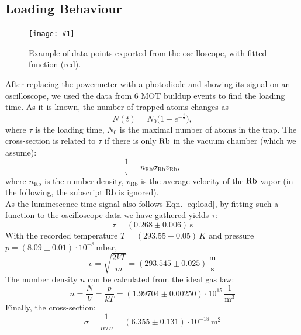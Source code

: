 \documentclass[twocolumn]{article}
\newcommand{\insertFigure}[1]{%
   \texttt{[image: \#1]}%
}
\begin{document}
\subsection{Loading Behaviour}
\begin{figure} [!h]
\centering
\insertFigure{Images/mot_buildup.png}
\caption{Example of data points exported from the oscilloscope, with fitted function (red).}
\label{fig:buildup}
\end{figure}
After replacing the powermeter with a photodiode and showing its signal on an oscilloscope, we used the data from 6 MOT buildup events to find the loading time. As it is known,\cite{inexpensive} the number of trapped atoms changes as
\begin{equation}\label{eq:load}
N(t) = N_0 \big( 1 - e^{-\frac{t}{\tau}} \big),
\end{equation}
where $\tau$ is the loading time, $N_0$ is the maximal number of atoms in the trap. The cross-section is related to $\tau$ if there is only $\ce{Rb}$ in the vacuum chamber (which we assume):
\begin{equation}\label{eq:cross-section}
\frac{1}{\tau} = n_{\text{Rb}} \sigma_{\text{Rb}} v_{\text{Rb}},
\end{equation}
where $n_{\text{Rb}}$ is the number density, $v_{\text{Rb}}$ is the average velocity of the $\ce{Rb}$ vapor (in the following, the subscript Rb is ignored).\\
As the luminescence-time signal also follows Eqn. \ref{eq:load}, by fitting such a function to the oscilloscope data we have gathered yields $\tau$:
\begin{equation}
\tau = (0.268 \pm 0.006) \, \text{s}\nonumber
\end{equation}
With the recorded temperature $T = (293.55 \pm 0.05) \, K$ and pressure $p = (8.09 \pm 0.01)\cdot 10^{-8} \, \text{mbar}$,
\begin{equation}
v = \sqrt{\frac{2kT}{m}} = (293.545 \pm 0.025) \, \frac{\text{m}}{\text{s}} \nonumber
\end{equation}
The number density $n$ can be calculated from the ideal gas law:
\begin{equation}
n = \frac{N}{V} = \frac{p}{kT} = (1.99704 \pm 0.00250)\cdot 10^{15} \, \frac{1}{\text{m}^3}\nonumber
\end{equation}
Finally, the cross-section:
\begin{equation}
\sigma = \frac{1}{n \tau v} = (6.355 \pm 0.131) \cdot 10^{-18} \, \text{m}^2
\end{equation}
\end{document}
